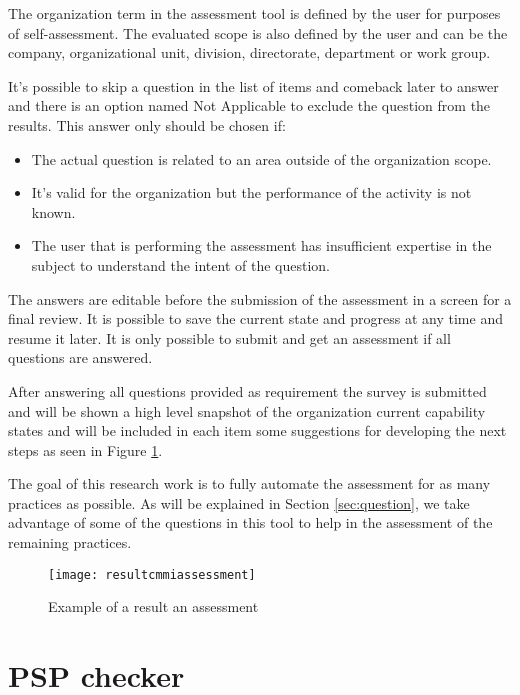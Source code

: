 The organization term in the assessment tool is defined by the user for purposes of  self-assessment. The evaluated scope is also defined by the user and can be the company, organizational unit, division, directorate, department or work group.

It's possible to skip a question in the list of items and comeback later to answer and there is an option named Not Applicable to exclude the question from the results. This answer only should be chosen if:
\begin{itemize}
	\item The actual question is related to an area outside of the organization scope.
	\item It's valid for the organization but the  performance of the activity is not known.
	\item The user that is performing the assessment has insufficient expertise in the subject to understand the intent of the question.
\end{itemize}

The answers are editable before the submission of the assessment in a screen for a final review. It is possible to save the current state and progress at any time and resume it later. It is only possible to submit and get an assessment if all questions are answered.

After answering all questions provided as requirement the survey is submitted and will be shown a high level snapshot of the organization  current capability states and will be included in each item some suggestions for developing the next steps as seen in Figure \ref{fig:assesment_result}.

The goal of this research work is to fully automate the assessment for as many practices as possible. As will be explained in Section \ref{sec:question}, we take advantage of some of the questions in this tool to help in the assessment of the remaining practices.

\newpage 

\begin{figure}[h]
	\begin{center}
		\leavevmode
		\texttt{[image: resultcmmiassessment]}
		\caption{Example of a result an assessment}
		\label{fig:assesment_result}
	\end{center}
\end{figure}


\section{PSP checker}

